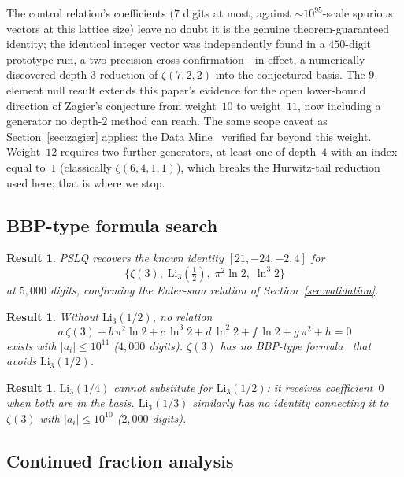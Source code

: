 \documentclass[12pt]{article}
\newtheorem{result}[theorem]{Result}
\theoremstyle{definition}
\theoremstyle{remark}
\begin{document}
\noindent The control relation's coefficients ($7$ digits at most,
against $\sim 10^{95}$-scale spurious vectors at this lattice size)
leave no doubt it is the genuine theorem-guaranteed identity; the
identical integer vector was independently found in a $450$-digit
prototype run, a two-precision cross-confirmation - in
effect, a numerically discovered depth-3 reduction of $\zeta(7,2,2)$
into the conjectured basis.  The $9$-element null result extends this
paper's evidence for the open lower-bound direction of Zagier's
conjecture from weight~$10$ to weight~$11$, now including a generator
no depth-2 method can reach.  The same scope caveat as
Section~\ref{sec:zagier} applies: the Data Mine~\cite{BBV2010}
verified far beyond this weight.  Weight~$12$ requires two further
generators, at least one of depth~$4$ with an index equal to~$1$
(classically $\zeta(6,4,1,1)$), which breaks the Hurwitz-tail
reduction used here; that is where we stop.

\subsection{BBP-type formula search}\label{sec:bbp}

\begin{result}\label{res:bbp-validation}
PSLQ recovers the known identity $[21,-24,-2,4]$ for
\[
  \{\zeta(3),\;\mathrm{Li}_3(\tfrac{1}{2}),\;\pi^2\ln 2,\;\ln^{3} 2\}
\]
at $5{,}000$ digits, confirming the Euler-sum relation of
Section~\ref{sec:validation}.
\end{result}

\begin{result}\label{res:bbp-no-li3}
Without $\mathrm{Li}_3(1/2)$, no relation
\[
  a\,\zeta(3)+b\,\pi^2\ln 2+c\,\ln^{3} 2+d\,\ln^{2} 2
  +f\,\ln 2+g\,\pi^2+h=0
\]
exists with $|a_i|\le 10^{11}$ ($4{,}000$ digits).  $\zeta(3)$ has no
BBP-type formula~\cite{BaileyBorweinPlouffe1997} that avoids
$\mathrm{Li}_3(1/2)$.
\end{result}

\begin{result}\label{res:bbp-other}
$\mathrm{Li}_3(1/4)$ cannot substitute for $\mathrm{Li}_3(1/2)$: it
receives coefficient~$0$ when both are in the basis.
$\mathrm{Li}_3(1/3)$ similarly has no identity connecting it to
$\zeta(3)$ with $|a_i|\le 10^{10}$ ($2{,}000$ digits).
\end{result}


\subsection{Continued fraction analysis}\label{sec:cf}
\end{document}
